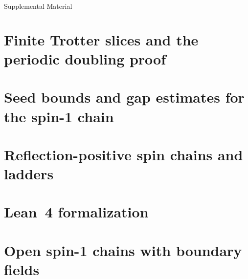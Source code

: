 \documentclass[aps,prl,reprint,floatfix,amsmath,amssymb,nofootinbib]{revtex4-2}
\begin{document}
\par\label{main:text-end}




\clearpage
\appendix
\renewcommand{\appendixname}{}
\setcounter{secnumdepth}{3}
\def\theHequation{supp.\arabic{equation}}
\def\theHtable{supp.\arabic{table}}
\def\theHfigure{supp.\arabic{figure}}
\def\theHtheorem{supp.\arabic{theorem}}
\def\theHlemma{supp.\arabic{lemma}}
\def\theHproposition{supp.\arabic{proposition}}
\renewcommand{\thesection}{S\Roman{section}}
\renewcommand{\thesubsection}{\thesection.\Alph{subsection}}
\makeatletter
{}
\def\p@subsection{}
\def\p@subsubsection{\thesubsection.}
\makeatother
\setcounter{figure}{0}
\renewcommand{\thefigure}{S\arabic{figure}}
\setcounter{theorem}{0}
\renewcommand{\thetheorem}{S\arabic{theorem}}
\setcounter{lemma}{0}
\renewcommand{\thelemma}{S\arabic{lemma}}
\setcounter{proposition}{0}
\renewcommand{\theproposition}{S\arabic{proposition}}
\onecolumngrid
\setcounter{equation}{0}
\renewcommand{\theequation}{S\arabic{equation}}
\setcounter{table}{0}
\renewcommand{\thetable}{S\arabic{table}}
\begin{center}\large Supplemental Material\end{center}

\section{Finite Trotter slices and the periodic doubling proof}
\label{sm:sec:trotter}

\section{Seed bounds and gap estimates for the spin-1 chain}
\label{sm:sec:seeds}

\section{Reflection-positive spin chains and ladders}
\label{sm:sec:models}

\section{Lean~4 formalization}
\label{sm:sec:blueprint}

\section{Open spin-1 chains with boundary fields}
\label{sm:sec:obc}

\end{document}

